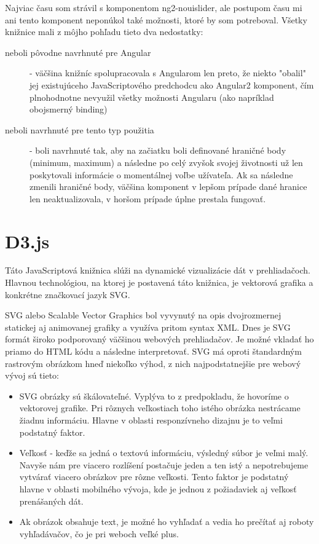\documentclass[
  digital, %
  twoside, %
  notable,   %
  nolof,   %
  nolot,   %
]{fithesis3}
\newcommand{\inquotes}[1]{{}"{}#1{}"{}}
\begin{document}
Najviac času som strávil s komponentom ng2-nouislider\cite{ng2nouislider}, ale postupom času mi ani tento komponent neponúkol také možnosti, ktoré by som potreboval. Všetky knižnice mali z môjho pohľadu tieto dva nedostatky:
\begin{description}
\item[neboli pôvodne navrhnuté pre Angular] - väčšina knižníc spolupracovala s Angularom len preto, že niekto \inquotes{obalil} jej existujúceho JavaScriptového predchodcu ako Angular2 komponent, čím plnohodnotne nevyužil všetky možnosti Angularu (ako napríklad obojsmerný binding)
\item[neboli navrhnuté pre tento typ použitia] - boli navrhnuté tak, aby na začiatku boli definované hraničné body (minimum, maximum) a následne po celý zvyšok svojej životnosti už len poskytovali informácie o momentálnej voľbe užívateľa. Ak sa následne zmenili hraničné body, väčšina komponent v lepšom prípade dané hranice len neaktualizovala, v horšom prípade úplne prestala fungovať.
\end{description}

\section{D3.js}
Táto JavaScriptová knižnica slúži na dynamické vizualizácie dát v prehliadačoch. Hlavnou technológiou, na ktorej je postavená táto knižnica, je vektorová grafika a konkrétne značkovací jazyk SVG.

SVG alebo Scalable Vector Graphics bol vyvynutý na opis dvojrozmernej statickej aj animovanej grafiky a využíva pritom syntax XML\cite{quint2003scalable}.
Dnes je SVG formát široko podporovaný väčšinou webových prehliadačov. Je možné vkladať ho priamo do HTML kódu a následne interpretovať. SVG má oproti štandardným rastrovým obrázkom hneď niekoľko výhod, z nich najpodstatnejšie pre webový vývoj sú tieto:
\begin{itemize}
\item SVG obrázky sú škálovateľné. Vyplýva to z predpokladu, že hovoríme o vektorovej grafike. Pri rôznych veľkostiach toho istého obrázka nestrácame žiadnu informáciu. Hlavne v oblasti responzívneho dizajnu je to veľmi podstatný faktor.
\item Veľkosť - keďže sa jedná o textovú informáciu, výsledný súbor je veľmi malý. Navyše nám pre viacero rozlíšení postačuje jeden a ten istý a nepotrebujeme vytvárať viacero obrázkov pre rôzne veľkosti. Tento faktor je podstatný hlavne v oblasti mobilného vývoja, kde je jednou z požiadaviek aj veľkosť prenášaných dát.
\item Ak obrázok obsahuje text, je možné ho vyhľadať a vedia ho prečítať aj roboty vyhľadávačov, čo je pri weboch veľké plus.
\end{itemize}
\end{document}
